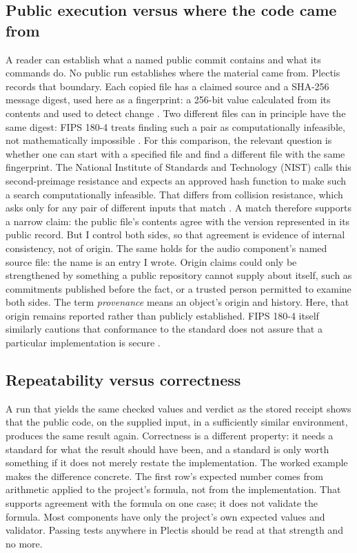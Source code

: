 \documentclass[11pt]{article}
\begin{document}
\subsection*{Public execution versus where the code came from}

A reader can establish what a named public commit contains and what its
commands do. No public run establishes where the material came from.
Plectis records that boundary. Each copied file has a claimed source and a
SHA-256 message digest, used here as a fingerprint: a 256-bit value calculated
from its contents and used to detect change
\cite[abstract, p.~iii; \S1 and Fig.~1, p.~3; \S6.2, p.~21]{nistfips1804}.
Two different files can in principle have the same digest: FIPS 180-4 treats
finding such a pair as computationally infeasible, not mathematically
impossible \cite[p.~iv]{nistfips1804}. For this comparison, the relevant question is
whether one can start with a specified file and find a different file with the
same fingerprint. The National Institute of Standards and Technology (NIST)
calls this second-preimage resistance and expects an approved hash function to
make such a search computationally infeasible. That differs from collision
resistance, which asks only for any pair of different inputs that match
\cite[security-strength table]{nisthashfunctions}. A match therefore supports a
narrow claim: the public file's contents agree with the version represented in
its public record. But I control both sides, so that agreement is evidence of
internal consistency, not of origin. The same holds for the
audio component's named source file: the name is an entry I wrote. Origin
claims could only be strengthened by something a public repository cannot
supply about itself, such as commitments published before the fact, or a
trusted person permitted to examine both sides. The term \emph{provenance}
means an object's origin and history. Here, that origin remains reported
rather than publicly established. FIPS 180-4 itself similarly cautions that
conformance to the standard does not assure that a particular implementation
is secure \cite[qualification 12, p.~v]{nistfips1804}.

\subsection*{Repeatability versus correctness}

A run that yields the same checked values and verdict as the stored receipt
shows that the public code, on the supplied input, in a sufficiently similar
environment, produces the same result again. Correctness is a different
property: it needs a standard for
what the result should have been, and a standard is only worth something if
it does not merely restate the implementation. The worked example makes the
difference concrete. The first row's expected number comes from arithmetic
applied to the project's formula, not from the implementation. That supports
agreement with the formula on one case; it does not validate the formula.
Most components have only the project's own expected values and validator.
Passing tests anywhere in Plectis should be read at that strength and no more.
\end{document}
